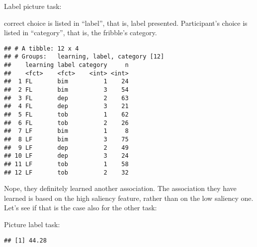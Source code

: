 \documentclass[
]{article}
\newenvironment{Shaded}{\begin{snugshade}}{\end{snugshade}}
\newcommand{\CommentTok}[1]{\textcolor[rgb]{0.56,0.35,0.01}{\textit{#1}}}
\newcommand{\DecValTok}[1]{\textcolor[rgb]{0.00,0.00,0.81}{#1}}
\newcommand{\KeywordTok}[1]{\textcolor[rgb]{0.13,0.29,0.53}{\textbf{#1}}}
\newcommand{\NormalTok}[1]{#1}
\newcommand{\OperatorTok}[1]{\textcolor[rgb]{0.81,0.36,0.00}{\textbf{#1}}}
\newcommand{\StringTok}[1]{\textcolor[rgb]{0.31,0.60,0.02}{#1}}
\begin{document}
Label picture task:

correct choice is listed in ``label'', that is, label presented.
Participant's choice is listed in ``category'', that is, the fribble's
category.

\begin{Shaded}
\end{Shaded}

\begin{verbatim}
## # A tibble: 12 x 4
## # Groups:   learning, label, category [12]
##    learning label category     n
##    <fct>    <fct>    <int> <int>
##  1 FL       bim          1    24
##  2 FL       bim          3    54
##  3 FL       dep          2    63
##  4 FL       dep          3    21
##  5 FL       tob          1    62
##  6 FL       tob          2    26
##  7 LF       bim          1     8
##  8 LF       bim          3    75
##  9 LF       dep          2    49
## 10 LF       dep          3    24
## 11 LF       tob          1    58
## 12 LF       tob          2    32
\end{verbatim}

Nope, they definitely learned another association. The association they
have learned is based on the high saliency feature, rather than on the
low saliency one. Let's see if that is the case also for the other task:

Picture label task:

\begin{Shaded}
\end{Shaded}

\begin{verbatim}
## [1] 44.28
\end{verbatim}
\end{document}

